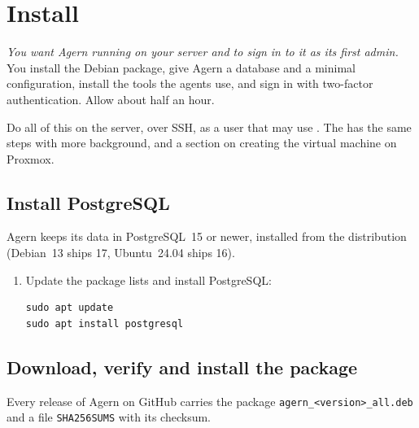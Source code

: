\chapter{Install}\label{ch:install}

\emph{You want Agern running on your server and to sign in to it as its first admin.} You install
the Debian package, give Agern a database and a minimal configuration, install the tools the
agents use, and sign in with two-factor authentication. Allow about half an hour.

Do all of this on the server, over SSH, as a user that may use . The
 has the same steps with more background, and a
section on creating the virtual machine on Proxmox.

\section{Install PostgreSQL}\label{sec:postgres}

Agern keeps its data in PostgreSQL~15 or newer, installed from the distribution (Debian~13 ships
17, Ubuntu~24.04 ships 16).

\begin{enumerate}
  \item Update the package lists and install PostgreSQL:
\begin{lstlisting}
sudo apt update
sudo apt install postgresql
\end{lstlisting}
\end{enumerate}

\section{Download, verify and install the package}\label{sec:install-deb}

Every release of Agern on GitHub carries the package \texttt{agern\_<version>\_all.deb} and a file
\texttt{SHA256SUMS} with its checksum.

